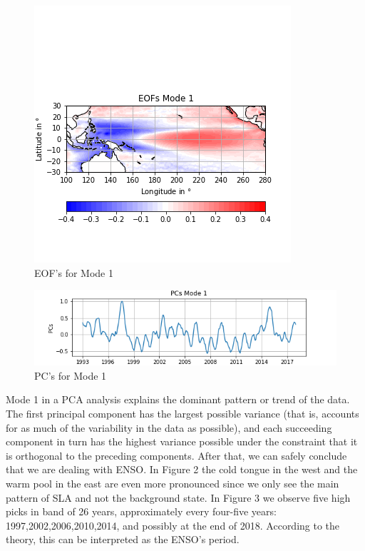 \documentclass{article}
\begin{document}
\begin{figure}[b!]
\centering
\includegraphics[width=1.0\linewidth]{EOFmode1.png}
\caption{EOF's for Mode 1}
\label{fig:EOF1}
\end{figure}

\begin{figure}[b!]
\centering
\includegraphics[width=1.0\linewidth]{PCsmode1.png}
\caption{PC's for Mode 1}
\label{fig:DPC1}
\end{figure}

Mode 1 in a PCA analysis explains the dominant pattern or trend of the data. The first principal component has the largest possible variance (that is, accounts for as much of the variability in the data as possible), and each succeeding component in turn has the highest variance possible under the constraint that it is orthogonal to the preceding components. 
After that, we can safely conclude that we are dealing with ENSO. In Figure 2 the cold tongue in the west and the warm pool in the east are even more pronounced since we only see the main pattern of SLA and not the background state. In Figure 3 we observe five high picks in band of 26 years, approximately every four-five years: 1997,2002,2006,2010,2014, and possibly at the end of 2018. According to the theory, this can be interpreted as the ENSO's period.
\end{document}
